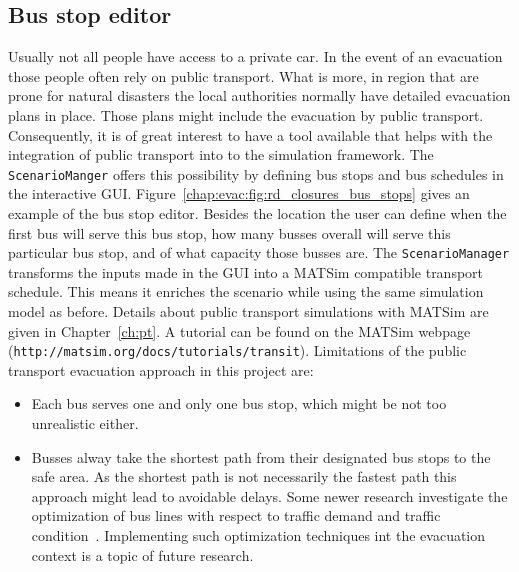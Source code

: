 \subsection{Bus stop editor}
Usually not all people have access to a private car. In the event of an evacuation those people often rely on public transport. What is more, in region that are prone for natural disasters the local authorities normally have detailed evacuation plans in place. Those plans might include the evacuation by public transport. Consequently, it is of great interest to have a tool available that helps with the integration of public transport into to the simulation framework. The \verb+ScenarioManger+ offers this possibility by defining bus stops and bus schedules in the interactive GUI. Figure~\ref{chap:evac:fig:rd_closures_bus_stops} gives an example of the bus stop editor. Besides the location the user can define when the first bus will serve this bus stop, how many busses overall will serve this particular bus stop, and of what capacity those busses are. 
The \verb+ScenarioManager+ transforms the inputs made in the GUI into a MATSim compatible transport schedule. This means it enriches the scenario while using the same simulation model as before. Details about public transport simulations with MATSim are given in Chapter~\ref{ch:pt}. A tutorial can be found on the MATSim webpage (\verb+http://matsim.org/docs/tutorials/transit+).
Limitations of the public transport evacuation approach in this project are:
\begin{itemize}
\item Each bus serves one and only one bus stop, which might be not too unrealistic either.
\item Busses alway take the shortest path from their designated bus stops to the safe area. As the shortest path is not necessarily the fastest path this approach might lead to avoidable delays. Some newer research investigate the optimization of bus lines with respect to traffic demand and traffic condition~\citep{Neumann_PhDThesis_2014}. Implementing such optimization techniques int the evacuation context is a topic of future research.
\end{itemize}

